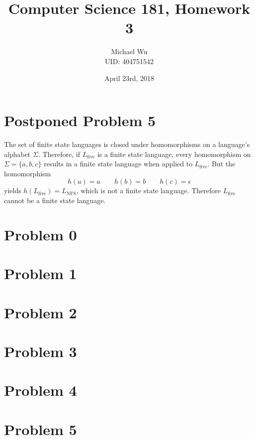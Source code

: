 \documentclass[12pt]{article}
\begin{document}
\title{Computer Science 181, Homework 3}
\date{April 23rd, 2018}
\author{Michael Wu\\UID: 404751542}
\maketitle

\section*{Postponed Problem 5}

The set of finite state languages is closed under homomorphisms on a language's alphabet \(\Sigma\). Therefore, if \(L_\text{five}\) is a
finite state language, every homomorphism on \(\Sigma=\{a, b, c\}\) results in a finite state language when applied
to \(L_\text{five}\). But the homomorphism
\[h(a)=a \qquad h(b)=b \qquad h(c)=\epsilon\]
yields \(h(L_\text{five})=L_\text{NFS}\), which is not a finite state language. Therefore \(L_\text{five}\) cannot be a finite
state language.

\section*{Problem 0}

\section*{Problem 1}

\section*{Problem 2}

\section*{Problem 3}

\section*{Problem 4}

\section*{Problem 5}
\end{document}
